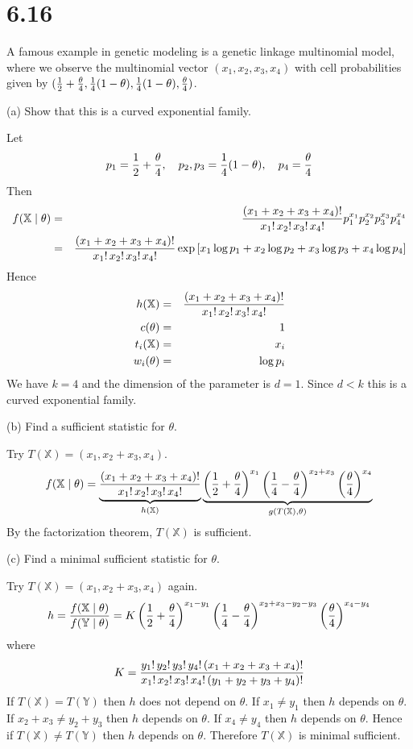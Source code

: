 \section*{6.16}
A famous example in genetic modeling is a genetic linkage
multinomial model, where we observe the multinomial vector
$(x_1,x_2,x_3,x_4)$ with cell probabilities given by
$({1\over2}+{\theta\over4},{1\over4}(1-\theta),
{1\over4}(1-\theta),{\theta\over4})$.

\bigskip
\noindent
(a) Show that this is a curved exponential family.

\bigskip
\noindent
Let
$$p_1={1\over2}+{\theta\over4},\quad
p_2,p_3={1\over4}(1-\theta),\quad
p_4={\theta\over4}
$$
Then
\begin{eqnarray*}
f(\mathbb X\mid\theta)&=&
{(x_1+x_2+x_3+x_4)!\over x_1!\,x_2!\,x_3!\,x_4!}
p_1^{x_1}
p_2^{x_2}
p_3^{x_3}
p_4^{x_4}\\
&=&{(x_1+x_2+x_3+x_4)!\over x_1!\,x_2!\,x_3!\,x_4!}
\exp\left[
x_1\log p_1
+x_2\log p_2
+x_3\log p_3
+x_4\log p_4
\right]
\end{eqnarray*}
Hence
\begin{eqnarray*}
h(\mathbb X)&=&{(x_1+x_2+x_3+x_4)!\over x_1!\,x_2!\,x_3!\,x_4!}\\
c(\theta)&=&1\\
t_i(\mathbb X)&=&x_i\\
w_i(\theta)&=&\log p_i
\end{eqnarray*}
We have $k=4$ and the dimension of the parameter is $d=1$.
Since $d<k$ this is a curved exponential family.

\bigskip
\noindent
(b) Find a sufficient statistic for $\theta$.

\bigskip
\noindent
Try $T(\mathbb X)=(x_1,x_2+x_3,x_4)$.
$$f(\mathbb X\mid\theta)
=
\underbrace{
{(x_1+x_2+x_3+x_4)!\over x_1!\,x_2!\,x_3!\,x_4!}
}_{h(\mathbb X)}
\underbrace{
\left({1\over2}+{\theta\over4}\right)^{x_1}
\left({1\over4}-{\theta\over4}\right)^{x_2+x_3}
\left({\theta\over4}\right)^{x_4}
}_{g(T(\mathbb X),\theta)}
$$
By the factorization theorem,
$T(\mathbb X)$ is sufficient.

\bigskip
\noindent
(c) Find a minimal sufficient statistic for $\theta$.

\bigskip
\noindent
Try $T(\mathbb X)=(x_1,x_2+x_3,x_4)$ again.
$$h=
{f(\mathbb X\mid\theta)\over f(\mathbb Y\mid\theta)}
=K
\left({1\over2}+{\theta\over4}\right)^{x_1-y_1}
\left({1\over4}-{\theta\over4}\right)^{x_2+x_3-y_2-y_3}
\left({\theta\over4}\right)^{x_4-y_4}
$$
where
$$K={y_1!\,y_2!\,y_3!\,y_4!\,(x_1+x_2+x_3+x_4)!\over
x_1!\,x_2!\,x_3!\,x_4!\,(y_1+y_2+y_3+y_4)!}
$$
If $T(\mathbb X)=T(\mathbb Y)$
then $h$ does not depend on $\theta$.
If $x_1\ne y_1$ then $h$ depends on $\theta$.
If $x_2+x_3\ne y_2+y_3$ then $h$ depends on $\theta$.
If $x_4\ne y_4$ then $h$ depends on $\theta$.
Hence if $T(\mathbb X)\ne T(\mathbb Y)$ then $h$ depends
on $\theta$.
Therefore $T(\mathbb X)$ is minimal sufficient.

